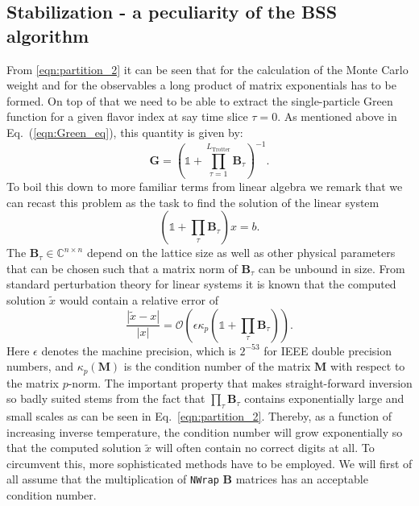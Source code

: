 \documentclass{SciPost}
\begin{document}
\subsection{Stabilization - a peculiarity of the BSS algorithm}\label{sec:stable}
%
From \eqref{eqn:partition_2} it can be seen that for the calculation of the Monte Carlo weight
and for the observables a long product of matrix exponentials has to be formed.
On top of that we need to be able to extract the single-particle Green function  for a given flavor index at say time slice $\tau = 0$.  As  mentioned above in Eq.~(\ref{eqn:Green_eq}), this quantity is given by: 
\begin{equation}
\bm{G}= \left( \mathds{1} + \prod_{ \tau= 1}^{L_{\text{Trotter}}} \bm{B}_\tau \right)^{-1}.
\end{equation}
To boil this down to more familiar terms from linear algebra we remark that we can recast this problem as the task to find the solution of the linear system
\begin{equation}
(\mathds{1} + \prod_\tau \bm{B}_\tau) x = b.
\end{equation}
The $\bm{B}_\tau \in \mathbb{C}^{n\times n}$ depend on the lattice size as well as other physical parameters that can be chosen such that a matrix norm of $\bm{B}_\tau$ can be unbound in size.
From standard perturbation theory for linear systems it is known that the computed solution $\tilde{x}$ would 
contain a relative error of
\begin{equation}
\frac{|\tilde{x} - x|}{|x|} = \mathcal{O}\left(\epsilon \kappa_p\left(\mathds{1} + \prod_\tau \bm{B}_\tau\right)\right).
\end{equation}
Here $\epsilon$ denotes the machine precision, which is $2^{-53}$ for IEEE double precision numbers,
and $\kappa_p(\bm{M})$ is the condition number of the matrix $\bm{M}$ with respect to the matrix $p$-norm.
The important property that makes straight-forward inversion so badly suited  stems from the fact that $  \prod_ \tau \bm{B}_\tau $ contains exponentially large and small scales as can be seen in Eq.~\eqref{eqn:partition_2}.  Thereby, as a function of increasing inverse temperature, 
the condition number will grow exponentially so that the computed solution $\tilde{x}$
will often contain no correct digits at all.
To circumvent this, more sophisticated methods have to be employed. We will first of all assume that the multiplication of \texttt{NWrap} $\bm{B}$ matrices has an acceptable condition number.
\end{document}

